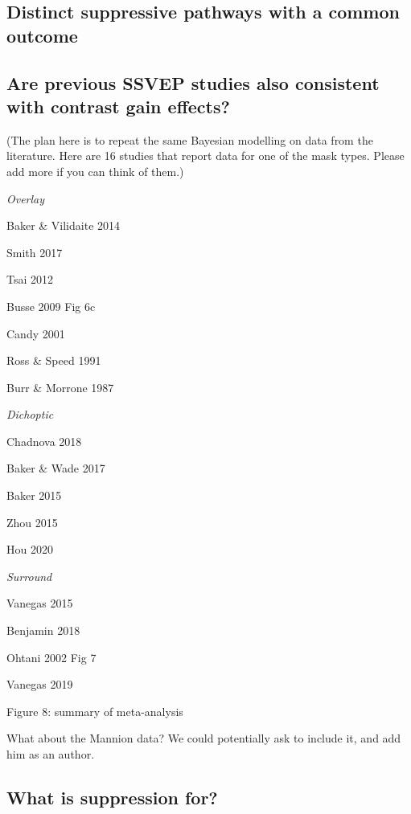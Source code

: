 \documentclass[]{article}
\begin{document}
\hypertarget{distinct-suppressive-pathways-with-a-common-outcome}{%
\subsection{Distinct suppressive pathways with a common outcome}\label{distinct-suppressive-pathways-with-a-common-outcome}}

\hypertarget{are-previous-ssvep-studies-also-consistent-with-contrast-gain-effects}{%
\subsection{Are previous SSVEP studies also consistent with contrast gain effects?}\label{are-previous-ssvep-studies-also-consistent-with-contrast-gain-effects}}

(The plan here is to repeat the same Bayesian modelling on data from the literature. Here are 16 studies that report data for one of the mask types. Please add more if you can think of them.)

\emph{Overlay}

Baker \& Vilidaite 2014

Smith 2017

Tsai 2012

Busse 2009 Fig 6c

Candy 2001

Ross \& Speed 1991

Burr \& Morrone 1987

\emph{Dichoptic}

Chadnova 2018

Baker \& Wade 2017

Baker 2015

Zhou 2015

Hou 2020

\emph{Surround}

Vanegas 2015

Benjamin 2018

Ohtani 2002 Fig 7

Vanegas 2019

Figure 8: summary of meta-analysis

What about the Mannion data? We could potentially ask to include it, and add him as an author.

\hypertarget{what-is-suppression-for}{%
\subsection{What is suppression for?}\label{what-is-suppression-for}}
\end{document}
